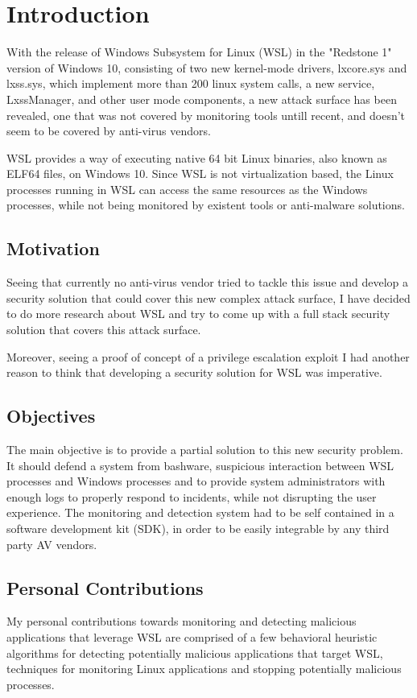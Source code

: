 \chapter{Introduction}
    With the release of Windows Subsystem for Linux (WSL) in the "Redstone 1" version of Windows 10, consisting of two new kernel-mode drivers,
    lxcore.sys and lxss.sys, which implement more than  200 linux system calls, a new service, LxssManager, and other user mode components,
    a new attack surface has been revealed, one that was not covered by monitoring tools untill recent, and doesn't seem to be covered by
    anti-virus vendors.

    WSL provides a way of executing native 64 bit Linux binaries, also known as ELF64 files, on Windows 10. Since WSL is not virtualization
    based, the Linux processes running in WSL can access the same resources as the Windows processes, while not being monitored by existent
    tools or anti-malware solutions.

    \section{Motivation}
        Seeing that currently no anti-virus vendor tried to tackle this issue and develop a security solution that could cover this new
        complex attack surface, I have decided to do more research about WSL and try to come up with a full stack security solution that covers
        this attack surface.
        
        Moreover, seeing a proof of concept of a privilege escalation exploit I had another reason to think that developing a security solution
        for WSL was imperative.

    \section{Objectives}
        The main objective is to provide a partial solution to this new security problem. It should defend a system from bashware,
        suspicious interaction between WSL processes and Windows processes and to provide system administrators with enough logs to properly
        respond to incidents, while not disrupting the user experience. The monitoring and detection system had to be self contained in
        a software development kit (SDK), in order to be easily integrable by any third party AV vendors.

    \section{Personal Contributions}
        My personal contributions towards monitoring and detecting malicious applications that leverage WSL are comprised of a few behavioral
        heuristic algorithms for detecting potentially malicious applications that target WSL, techniques for monitoring Linux applications
        and stopping potentially malicious processes.


